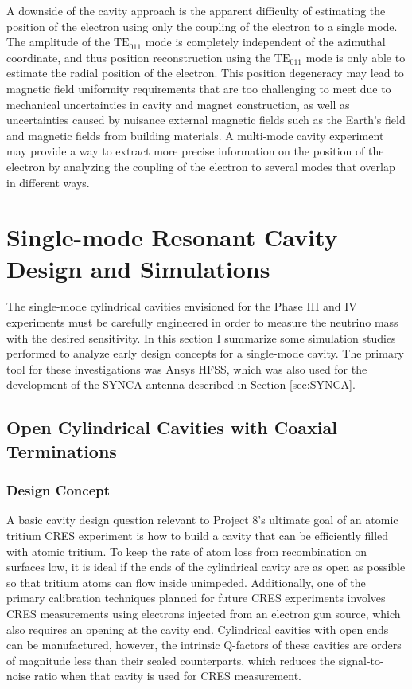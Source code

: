 A downside of the cavity approach is the apparent difficulty of estimating the position of the electron using only the coupling of the electron to a single mode. The amplitude of the $\mathrm{TE}_{011}$ mode is completely independent of the azimuthal coordinate, and thus position reconstruction using the $\mathrm{TE}_{011}$ mode is only able to estimate the radial position of the electron. This position degeneracy may lead to magnetic field uniformity requirements that are too challenging to meet due to mechanical uncertainties in cavity and magnet construction, as well as uncertainties caused by nuisance external magnetic fields such as the Earth's field and magnetic fields from building materials. A multi-mode cavity experiment may provide a way to extract more precise information on the position of the electron by analyzing the coupling of the electron to several modes that overlap in different ways.

\section{Single-mode Resonant Cavity Design and Simulations}
\label{sec:chap6-single-mode-cavity-sims}

The single-mode cylindrical cavities envisioned for the Phase III and IV experiments must be carefully engineered in order to measure the neutrino mass with the desired sensitivity. In this section I summarize some simulation studies performed to analyze early design concepts for a single-mode cavity. The primary tool for these investigations was Ansys HFSS, which was also used for the development of the SYNCA antenna described in Section \ref{sec:SYNCA}. 

\subsection{Open Cylindrical Cavities with Coaxial Terminations}
\label{sec:chap6-open-cavities}

\subsubsection*{Design Concept}

A basic cavity design question relevant to Project 8's ultimate goal of an atomic tritium CRES experiment is how to build a cavity that can be efficiently filled with atomic tritium. To keep the rate of atom loss from recombination on surfaces low, it is ideal if the ends of the cylindrical cavity are as open as possible so that tritium atoms can flow inside unimpeded. Additionally, one of the primary calibration techniques planned for future CRES experiments involves CRES measurements using electrons injected from an electron gun source, which also requires an opening at the cavity end. Cylindrical cavities with open ends can be manufactured, however, the intrinsic Q-factors of these cavities are orders of magnitude less than their sealed counterparts, which reduces the signal-to-noise ratio when that cavity is used for CRES measurement.

